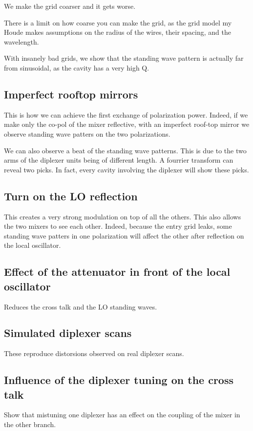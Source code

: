 We make the grid coarser and it gets worse.

There is a limit on how coarse you can make the grid, as the grid model my Houde makes assumptions on the radius of the wires, their spacing, and the wavelength.

With insanely bad grids, we show that the standing wave pattern is actually far from sinusoidal, as the cavity has a very high Q.

\subsection{Imperfect rooftop mirrors}
This is how we can achieve the first exchange of polarization power.
Indeed, if we make only the co-pol of the mixer reflective, with an imperfect roof-top mirror we observe standing wave patters on the two polarizations.

We can also observe a beat of the standing wave patterns.  This is due to the two arms of the diplexer units being of different length.  A fourrier transform can reveal two picks.
In fact, every cavity involving the diplexer will show these picks.

\subsection{Turn on the LO reflection}
This creates a very strong modulation on top of all the others.
This also allows the two mixers to see each other.
Indeed, because the entry grid leaks, some standing wave patters in one polarization will affect the other after reflection on the local oscillator.

\subsection{Effect of the attenuator in front of the local oscillator}
Reduces the cross talk and the LO standing waves.

\subsection{Simulated diplexer scans}
These reproduce distorsions observed on real diplexer scans.

\subsection{Influence of the diplexer tuning on the cross talk}
Show that mistuning one diplexer has an effect on the coupling of the mixer in the other branch.
